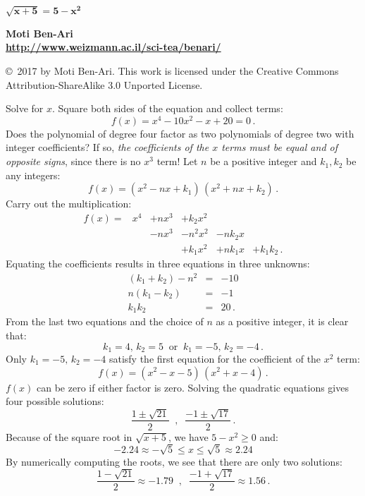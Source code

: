\documentclass[11pt,a4paper]{article}
\begin{document}
\thispagestyle{empty}
\begin{center}
\textbf{\LARGE $\mathbf{\sqrt{x+5}=5-x^2}$}

\bigskip

\textbf{\Large Moti Ben-Ari\\\bigskip\url{http://www.weizmann.ac.il/sci-tea/benari/}}

\bigskip
\end{center}


\begin{footnotesize}
\copyright{}\  2017 by Moti Ben-Ari. This work is licensed under the Creative Commons Attribution-ShareAlike 3.0 Unported License.
\end{footnotesize}

\bigskip

Solve for $x$. Square both sides of the equation and collect terms:
\[
f(x) = x^4 - 10 x^2 - x + 20 = 0\,.
\]
Does the polynomial of degree four factor as two polynomials of degree two with integer coefficients? If so, \textit{the coefficients of the $x$ terms must be equal and of opposite signs}, since there is no $x^3$ term! Let $n$ be a positive integer and $k_1,k_2$ be any integers:
\[
f(x) = (x^2 - nx + k_1)\, (x^2 + nx + k_2)\,.
\]
Carry out the multiplication:
\[
\renewcommand{\arraystretch}{1.2}
\begin{array}{rrrrrr}
f(x) = &x^4 & + nx^3 & + k_2 x^2\\
&& -nx^3 &- n^2x^2 &-nk_2x\\
&&&+k_1x^2 &+ nk_1x &+ k_1k_2\,.
\end{array}
\]
Equating the coefficients results in three equations in three unknowns:
\begin{eqnarray*}
(k_1+k_2)-n^2 &=& -10\\
n(k_1-k_2) &=& -1\\
k_1k_2 &=& 20\,.
\end{eqnarray*}
From the last two equations and the choice of $n$ as a positive integer, it is clear that:
\[
k_1=4,\,k_2=5  \;\;\textrm{or} \;\; k_1=-5,\, k_2=-4\,.
\]
Only $k_1=-5,\, k_2=-4$ satisfy the first equation for the coefficient of the $x^2$ term:
\[
f(x) = (x^2 - x - 5)\, (x^2 + x - 4)\,.
\]
$f(x)$ can be zero if either factor is zero. Solving the quadratic equations gives four possible solutions:
\[
\frac{1\pm\sqrt{21}}{2}  \;\;,\;\; \frac{-1\pm\sqrt{17}}{2} \,.
\]
Because of the square root in $\sqrt{x+5}$, we have $5-x^2\geq 0$ and:
\[
-2.24\approx-\sqrt{5}\leq x \leq \sqrt{5}\approx 2.24
\]
By numerically computing the roots, we see that there are only two solutions:
\[
\frac{1-\sqrt{21}}{2} \approx -1.79 \;\;,\;\; \frac{-1+\sqrt{17}}{2}\approx 1.56 \,.
\]
\end{document}
